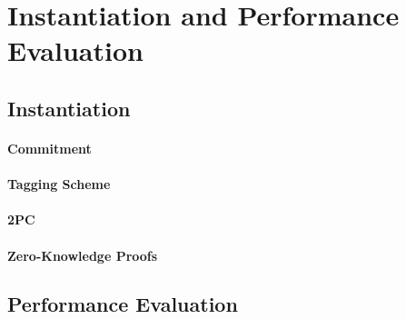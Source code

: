 
\section{Instantiation and Performance Evaluation}

\subsection{Instantiation}

\paragraph{Commitment}

\paragraph{Tagging Scheme}

\paragraph{2PC}

\paragraph{Zero-Knowledge Proofs}

\subsection{Performance Evaluation}


